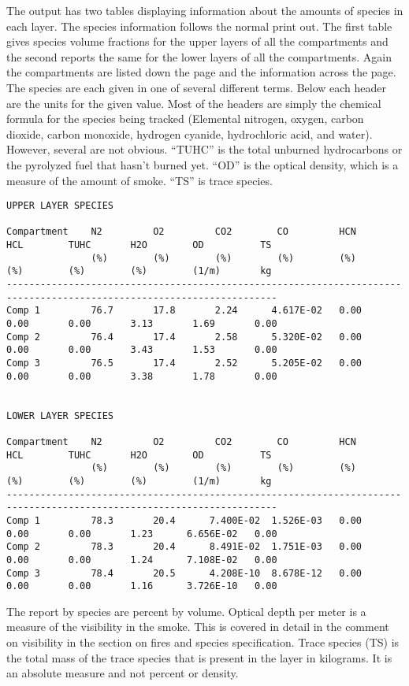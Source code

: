 The output has two tables displaying information about the amounts of species in each layer. The species information follows the normal print out.  The first table gives species volume fractions for the upper layers of all the compartments and the second reports the same for the lower layers of all the compartments.  Again the compartments are listed down the page and the information across the page.  The species are each given in one of several different terms.  Below each header are the units for the given value.  Most of the headers are simply the chemical formula for the species being tracked (Elemental nitrogen, oxygen, carbon dioxide, carbon monoxide, hydrogen cyanide, hydrochloric acid, and water).  However, several are not obvious.  ``TUHC'' is the total unburned hydrocarbons or the pyrolyzed fuel that hasn't burned yet.  ``OD'' is the optical density, which is a measure of the amount of smoke. ``TS'' is trace species.

\begin{lstlisting}[basicstyle=\tiny]
UPPER LAYER SPECIES

Compartment    N2         O2         CO2        CO         HCN        HCL        TUHC       H2O        OD          TS
               (%)        (%)        (%)        (%)        (%)        (%)        (%)        (%)        (1/m)       kg
----------------------------------------------------------------------------------------------------------------------
Comp 1         76.7       17.8       2.24      4.617E-02   0.00       0.00       0.00       3.13       1.69       0.00
Comp 2         76.4       17.4       2.58      5.320E-02   0.00       0.00       0.00       3.43       1.53       0.00
Comp 3         76.5       17.4       2.52      5.205E-02   0.00       0.00       0.00       3.38       1.78       0.00


LOWER LAYER SPECIES

Compartment    N2         O2         CO2        CO         HCN        HCL        TUHC       H2O        OD          TS
               (%)        (%)        (%)        (%)        (%)        (%)        (%)        (%)        (1/m)       kg
----------------------------------------------------------------------------------------------------------------------
Comp 1         78.3       20.4      7.400E-02  1.526E-03   0.00       0.00       0.00       1.23      6.656E-02   0.00
Comp 2         78.3       20.4      8.491E-02  1.751E-03   0.00       0.00       0.00       1.24      7.108E-02   0.00
Comp 3         78.4       20.5      4.208E-10  8.678E-12   0.00       0.00       0.00       1.16      3.726E-10   0.00
\end{lstlisting}
The report by species are percent by volume. Optical depth per meter is a measure of the visibility in the smoke. This is covered in detail in the comment on visibility in the section on fires and species specification. Trace species (TS) is the total mass of the trace species that is present in the layer in kilograms. It is an absolute measure and not percent or density.

